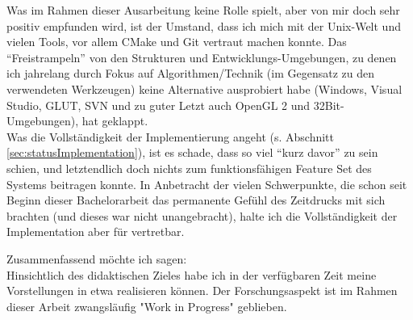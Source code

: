 Was im Rahmen dieser Ausarbeitung keine Rolle spielt, aber von mir doch sehr positiv empfunden wird,
ist der Umstand, dass ich mich mit der Unix-Welt und vielen Tools, vor allem CMake und Git vertraut
machen konnte. Das "`Freistrampeln"' von den Strukturen und Entwicklungs-Umgebungen,
zu denen ich jahrelang durch Fokus auf Algorithmen/Technik (im Gegensatz zu den verwendeten Werkzeugen)
keine Alternative ausprobiert habe (Windows, Visual Studio, GLUT, SVN und zu guter Letzt auch OpenGL 2 und 32Bit-Umgebungen), hat geklappt.\\

Was die Vollständigkeit der Implementierung angeht (s. Abschnitt \ref{sec:statusImplementation}), ist es schade,
dass so viel "`kurz davor"' zu sein schien, und letztendlich doch nichts zum funktionsfähigen Feature Set
des Systems beitragen konnte. In Anbetracht der vielen Schwerpunkte, die schon seit Beginn dieser Bachelorarbeit
das permanente Gefühl des Zeitdrucks mit sich brachten (und dieses war nicht unangebracht), halte ich die
Vollständigkeit der Implementation aber für vertretbar.


Zusammenfassend möchte ich sagen:\\
Hinsichtlich des didaktischen Zieles habe ich in der verfügbaren Zeit meine Vorstellungen in etwa realisieren können. Der Forschungsaspekt ist im Rahmen dieser Arbeit zwangsläufig "Work in Progress" geblieben.


\clearpage
